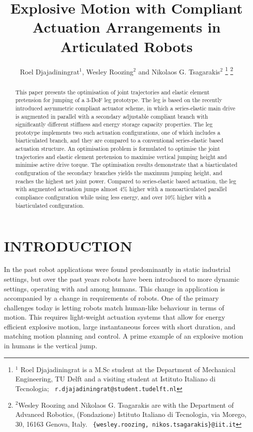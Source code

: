 \documentclass[letterpaper, 10 pt, conference]{ieeeconf}  %
\title{\LARGE \bf
	Explosive Motion with Compliant Actuation Arrangements in Articulated Robots
}
\author{Roel Djajadiningrat$^{1}$, Wesley Roozing$^{2}$ and Nikolaos G. Tsagarakis$^{2}$%
	\thanks{$^{1}$ Roel Djajadiningrat is a M.Sc student at the Department of Mechanical Engineering, TU Delft and a visiting student at Istituto Italiano di Tecnologia;
		{\tt\ r.djajadiningrat@student.tudelft.nl}
	}%
	\thanks{$^{2}$Wesley Roozing and Nikolaos G. Tsagarakis are with the Department of Advanced Robotics,
		(Fondazione) Istituto Italiano di Tecnologia, via Morego,
		30, 16163 Genova, Italy.
		{\tt\ \{wesley.roozing, nikos.tsagarakis\}@iit.it}
	}%
}
\begin{document}
	
	\maketitle
	\thispagestyle{empty}
	\pagestyle{empty}
	
	
	\begin{abstract}
		
		This paper presents the optimisation of joint trajectories and elastic element pretension for jumping of a 3-DoF leg prototype. The leg is based on the recently introduced asymmetric compliant actuator scheme, in which a series-elastic main drive is augmented in parallel with a secondary adjustable compliant branch with significantly different stiffness and energy storage capacity properties. The leg prototype implements two such actuation configurations, one of which includes a biarticulated branch, and they are compared to a conventional series-elastic based actuation structure. An optimisation problem is formulated to optimise the joint trajectories and elastic element pretension to maximise vertical jumping height and minimise active drive torque. The optimisation results demonstrate that a biarticulated configuration of the secondary branches yields the maximum jumping height, and reaches the highest net joint power. Compared to series-elastic based actuation, the leg with augmented actuation jumps almost 4\% higher with a monoarticulated parallel compliance configuration while using less energy, and over 10\% higher with a biarticulated configuration.
		
	\end{abstract}
	
	
	\section{INTRODUCTION}
	In the past robot applications were found predominantly in static industrial settings, but over the past years robots have been introduced to more dynamic settings, operating with and among humans. This change in application is accompanied by a change in requirements of robots. One of the primary challenges today is letting robots match human-like behaviour in terms of motion. This requires light-weight actuation systems that allow for energy efficient explosive motion, large instantaneous forces with short duration, and matching motion planning and control. A prime example of an explosive motion in humans is the vertical jump.
	
\end{document}
